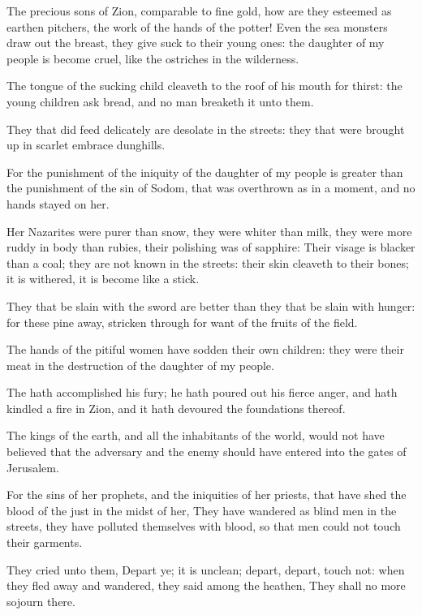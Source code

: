 \verse The precious sons of Zion, comparable to fine gold, how are they esteemed as earthen pitchers, the work of the hands of the potter!  \verse Even the sea monsters draw out the breast, they give suck to their young ones: the daughter of my people is become cruel, like the ostriches in the wilderness.

\verse The tongue of the sucking child cleaveth to the roof of his mouth for thirst: the young children ask bread, and no man breaketh it unto them.

\verse They that did feed delicately are desolate in the streets: they that were brought up in scarlet embrace dunghills.

\verse For the punishment of the iniquity of the daughter of my people is greater than the punishment of the sin of Sodom, that was overthrown as in a moment, and no hands stayed on her.

\verse Her Nazarites were purer than snow, they were whiter than milk, they were more ruddy in body than rubies, their polishing was of sapphire: \verse Their visage is blacker than a coal; they are not known in the streets: their skin cleaveth to their bones; it is withered, it is become like a stick.

\verse They that be slain with the sword are better than they that be slain with hunger: for these pine away, stricken through for want of the fruits of the field.

\verse The hands of the pitiful women have sodden their own children: they were their meat in the destruction of the daughter of my people.

\verse The \LORD hath accomplished his fury; he hath poured out his fierce anger, and hath kindled a fire in Zion, and it hath devoured the foundations thereof.

\verse The kings of the earth, and all the inhabitants of the world, would not have believed that the adversary and the enemy should have entered into the gates of Jerusalem.

\verse For the sins of her prophets, and the iniquities of her priests, that have shed the blood of the just in the midst of her, \verse They have wandered as blind men in the streets, they have polluted themselves with blood, so that men could not touch their garments.

\verse They cried unto them, Depart ye; it is unclean; depart, depart, touch not: when they fled away and wandered, they said among the heathen, They shall no more sojourn there.

